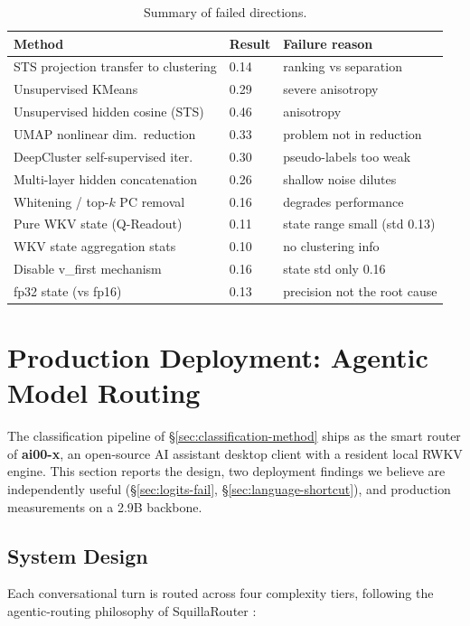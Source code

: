 \documentclass[11pt]{article}
\begin{document}
\begin{table}[h]
\centering
\begin{tabular}{lll}
\toprule
Method & Result & Failure reason \\
\midrule
STS projection transfer to clustering & 0.14 & ranking vs separation \\
Unsupervised KMeans & 0.29 & severe anisotropy \\
Unsupervised hidden cosine (STS) & 0.46 & anisotropy \\
UMAP nonlinear dim.\ reduction & 0.33 & problem not in reduction \\
DeepCluster self-supervised iter. & 0.30 & pseudo-labels too weak \\
Multi-layer hidden concatenation & 0.26 & shallow noise dilutes \\
Whitening / top-$k$ PC removal & 0.16 & degrades performance \\
Pure WKV state (Q-Readout) & 0.11 & state range small (std 0.13) \\
WKV state aggregation stats & 0.10 & no clustering info \\
Disable v\_first mechanism & 0.16 & state std only 0.16 \\
fp32 state (vs fp16) & 0.13 & precision not the root cause \\
\bottomrule
\end{tabular}
\caption{Summary of failed directions.}
\end{table}

\section{Production Deployment: Agentic Model Routing}
\label{sec:production}

The classification pipeline of \S\ref{sec:classification-method} ships as
the smart router of \textbf{ai00-x}, an open-source AI assistant desktop
client with a resident local RWKV engine. This section reports the design,
two deployment findings we believe are independently useful
(\S\ref{sec:logits-fail}, \S\ref{sec:language-shortcut}), and production
measurements on a 2.9B backbone.

\subsection{System Design}

Each conversational turn is routed across four complexity tiers, following
the agentic-routing philosophy of SquillaRouter \cite{squillarouter}:
\end{document}
